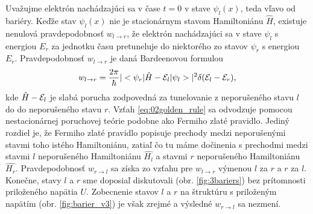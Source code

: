 Uvažujme elektrón nachádzajúci sa v čase $t=0$ v stave $\psi_{l}(x)$, teda vľavo od bariéry. Keďže stav $\psi_{l}(x)$
nie je stacionárnym stavom Hamiltoniánu $\hat{H}$, existuje nenulová pravdepodobnosť $w_{l\to r}$,
že elektrón nachádzajúci sa v stave $\psi_l$ s energiou $E_r$ za jednotku času pretuneluje do niektorého zo stavov $\psi_r$ s energiou $E_r$.
Pravdepodobnosť $w_{l\to r}$ je daná Bardeenovou formulou
\begin{equation}
 \label{eq:02golden_rule}
 w_{l\to r}=\frac{2\pi}{\hbar} |<\psi_r|\hat{H}-\mathcal{E}_l|\psi_l>|^{2} \delta(\mathcal{E}_l-\mathcal{E}_r)\text{,}
\end{equation}
kde $\hat{H}-\mathcal{E}_l$ je slabá porucha zodpovedná za tunelovanie z neporušeného stavu $l$ do do neporušeného stavu $r$.
Vzťah \eqref{eq:02golden_rule} sa odvodzuje pomocou nestacionárnej poruchovej teórie podobne ako Fermiho zlaté pravidlo.
Jediný rozdiel je, že Fermiho zlaté pravidlo popisuje prechody medzi neporušenými stavmi toho istého Hamiltoniánu, zatiaľ čo tu máme dočinenia
s prechodmi medzi stavmi $l$ neporušeného Hamiltoniánu $\hat{H_l}$ a stavmi $r$ neporušeného Hamiltoniánu $\hat{H_r}$.
Pravdepodobnosť $w_{r\to l}$ sa získa zo vzťahu pre $w_{l\to r}$ výmenou $l$ za $r$ a $r$ za $l$.
Konečne, stavy $l$ a $r$ sme doposiaľ diskutovali (obr. \ref{fig:3bariers})  bez prítomnosti priloženého napätia $U$.
Zobecnenie stavov $l$ a $r$ na štruktúru s priloženým napätím  (obr. \ref{fig:barier_v3}) je však zrejmé a výsledné $w_{r\to l}$ sa nezmení.

